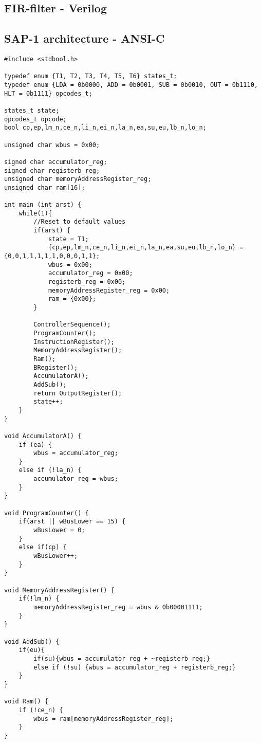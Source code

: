 \subsection{FIR-filter - Verilog}

\subsection{SAP-1 architecture - ANSI-C}
\begin{lstlisting}[caption=SAP-1 architecture implemented in C]
#include <stdbool.h>

typedef enum {T1, T2, T3, T4, T5, T6} states_t;
typedef enum {LDA = 0b0000, ADD = 0b0001, SUB = 0b0010, OUT = 0b1110, HLT = 0b1111} opcodes_t;

states_t state;
opcodes_t opcode;
bool cp,ep,lm_n,ce_n,li_n,ei_n,la_n,ea,su,eu,lb_n,lo_n; 
 
unsigned char wbus = 0x00;
 
signed char accumulator_reg;
signed char registerb_reg;
unsigned char memoryAddressRegister_reg;
unsigned char ram[16];
 
int main (int arst) {
	while(1){
		//Reset to default values
		if(arst) {
			state = T1;
			{cp,ep,lm_n,ce_n,li_n,ei_n,la_n,ea,su,eu,lb_n,lo_n} = {0,0,1,1,1,1,1,0,0,0,1,1};
			wbus = 0x00;
			accumulator_reg = 0x00;
			registerb_reg = 0x00;
			memoryAddressRegister_reg = 0x00;
			ram = {0x00};
		}
		
		ControllerSequence();
		ProgramCounter();
		InstructionRegister();
		MemoryAddressRegister();
		Ram();
		BRegister();
		AccumulatorA();
		AddSub();
		return OutputRegister();
		state++;
	}
}

void AccumulatorA() {
	if (ea) {
		wbus = accumulator_reg;
	}
	else if (!la_n) {
		accumulator_reg = wbus;
	}
}

void ProgramCounter() {
	if(arst || wBusLower == 15) {
		wBusLower = 0;
	}
	else if(cp) {
		wBusLower++;
	}
}

void MemoryAddressRegister() {
	if(!lm_n) {
		memoryAddressRegister_reg = wbus & 0b00001111;
	}
}

void AddSub() {
	if(eu){
		if(su){wbus = accumulator_reg + ~registerb_reg;}
		else if (!su) {wbus = accumulator_reg + registerb_reg;}
	}
}

void Ram() {
	if (!ce_n) {
		wbus = ram[memoryAddressRegister_reg];
	}
}


\end{lstlisting}
